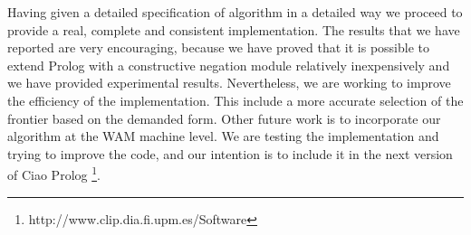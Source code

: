 \documentclass{llncs}
\begin{document}

Having given a detailed specification of algorithm in a detailed way
we proceed to provide a real, complete and consistent
implementation. The results that we have reported are very
encouraging, because we have proved that it is possible to extend
Prolog with a constructive negation module relatively inexpensively
and we have provided experimental results. Nevertheless, we are
working to improve the efficiency of the implementation. This include
a more accurate selection of the frontier based on the demanded
form. Other future work is to incorporate our algorithm at the WAM
machine level. We are testing the implementation and trying to improve
the code, and our intention is to include it in the next version of
Ciao Prolog
\footnote{http://www.clip.dia.fi.upm.es/Software}.
  


\begin{small}

     
    

\end{small}


\end{document}
